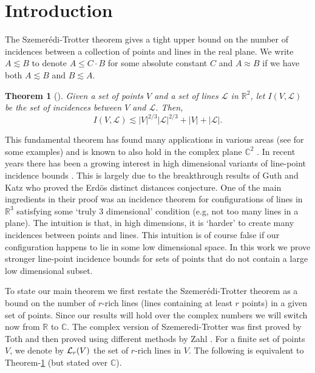 \documentclass[11pt]{article}
\newtheorem{thm}{Theorem}[section]
\def\L{{\mathcal L}}
\def\R{{\mathbb{R}}}
\def\C{{\mathbb{C}}}
\def\cL{{\cal L}}
\begin{document}
\section{Introduction}

The Szemer\'edi-Trotter theorem gives a tight upper bound on the number of incidences between a collection of points and lines in the real plane. We write $A\lesssim B$ to denote $A\le C\cdot B$ for some absolute constant $C$ and $A \approx B$ if we have both $A \lesssim B$ and $B \lesssim A$.
\begin{thm}[\cite{ST83}]
\label{thm-Szemeredi-Trotter}
Given a set of points $V$ and a set of lines $\L$ in $\R^2$, let $I(V,\L)$ be the set of incidences between $V$ and $\L$. Then,
$$I(V,\L)\lesssim |V|^{2/3}|\L|^{2/3}+|V|+|\L|.$$
\end{thm}  
This fundamental theorem has found many applications in various areas (see \cite{Dvir-survey} for some examples) and is  known to also hold in the 
complex plane $\C^2$ \cite{Toth,Zahl}.  In recent years there has been a growing interest in high dimensional variants of line-point incidence bounds \cite{SSZ13, Kollar14, Rudnev14, SS14, ST12,BS14}. This is largely due to the breakthrough results of Guth and Katz \cite{GK10} who proved the Erd\"os distinct distances conjecture. One of the main ingredients in their proof was an incidence theorem for configurations of lines in $\R^3$  satisfying some  `truly 3 dimensional' condition (e.g, not too many lines in a plane). The intuition is that, in high dimensions, it is `harder' to create many incidences between points and lines. This intuition is of course false if our configuration happens to lie in some low dimensional space. In this work we prove stronger line-point incidence bounds for sets of points that do not contain a large low dimensional subset. %


To state our main theorem we first  restate the  Szemer\'edi-Trotter theorem as a bound on the number of $r$-rich lines (lines containing at least $r$ points)  in a given set of points. Since our results will hold over the complex numbers we will switch now from $\R$ to $\C$. The complex version of Szemeredi-Trotter was first proved by Toth \cite{Toth} and then proved using different methods by Zahl \cite{Zahl}. For a finite set of points $V$, we denote by $\cL_r(V)$ the set of $r$-rich lines in $V$. The following is equivalent to Theorem-\ref{thm-Szemeredi-Trotter} (but stated over $\C$).
\end{document}
